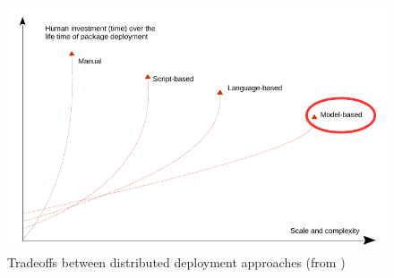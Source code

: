\begin{figure}
	\centering
	\includegraphics[width=1\columnwidth]{chapters/stateOfTheArt.images/TradeoffsDeployment.pdf}
	\caption{Tradeoffs between distributed deployment approaches (from \cite{talwar2005approaches})}
	\label{fig:tradeoffsDeployment}
\end{figure}


